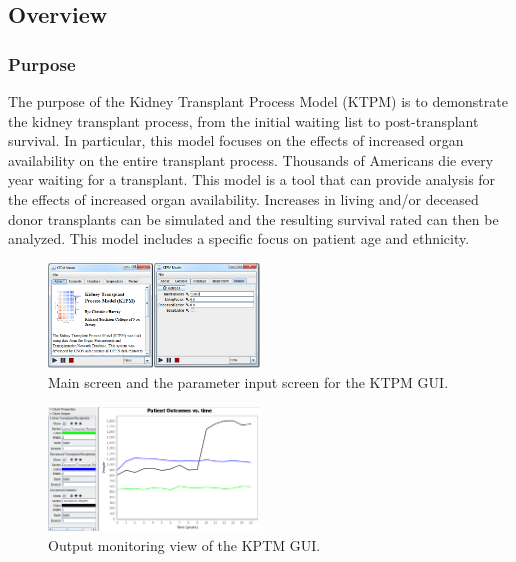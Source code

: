\documentclass[9pt,a4paper,twocolumn]{scrartcl}
\begin{document}
\subsection{Overview}
\subsubsection{Purpose}
The purpose of the Kidney Transplant Process Model (KTPM) is to demonstrate the kidney transplant process, from the initial waiting list to post-transplant survival.  In particular, this model focuses on the effects of increased organ availability on the entire transplant process.  Thousands of Americans die every year waiting for a transplant.  This model is a tool that can provide analysis for the effects of increased organ availability.  Increases in living and/or deceased donor transplants can be simulated and the resulting survival rated can then be analyzed.  This model includes a specific focus on patient age and ethnicity.

\begin{figure}[h!]
  \caption{Main screen and the parameter input screen for the KTPM GUI.}
  \centering
    \includegraphics[width=0.5\textwidth]{GUIscreen}
\end{figure}

\begin{figure}[h!]
  \caption{Output monitoring view of the KPTM GUI.}
  \centering
    \includegraphics[width=0.5\textwidth]{GUIChart}
\end{figure}
\end{document}
